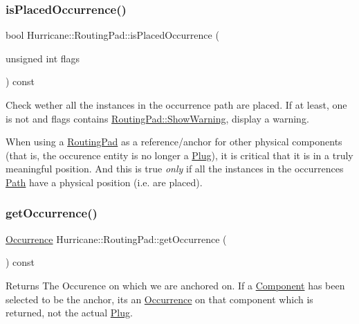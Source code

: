 \subsubsection{\texorpdfstring{is\+Placed\+Occurrence()}{isPlacedOccurrence()}}
{\footnotesize\ttfamily bool Hurricane\+::\+Routing\+Pad\+::is\+Placed\+Occurrence (\begin{DoxyParamCaption}\item[{unsigned int}]{flags }\end{DoxyParamCaption}) const}

Check wether all the instances in the occurrence path are placed. If at least, one is not and {\ttfamily flags} contains \hyperlink{classHurricane_1_1RoutingPad_a69f37f0b06b9bfd758d9be42c71e2bd4a8fd74358022a29aab828700c8f7347ba}{Routing\+Pad\+::\+Show\+Warning}, display a warning.

When using a \hyperlink{classHurricane_1_1RoutingPad}{Routing\+Pad} as a reference/anchor for other physical components (that is, the occurence entity is no longer a \hyperlink{classHurricane_1_1Plug}{Plug}), it is critical that it is in a truly meaningful position. And this is true {\itshape only} if all the instances in the occurrence\textquotesingle{}s \hyperlink{classHurricane_1_1Path}{Path} have a physical position (i.\+e. are placed). \mbox{\label{classHurricane_1_1RoutingPad_a2767550364ef01c772f3270850ec052f}} 
\subsubsection{\texorpdfstring{get\+Occurrence()}{getOccurrence()}}
{\footnotesize\ttfamily \hyperlink{classHurricane_1_1Occurrence}{Occurrence} Hurricane\+::\+Routing\+Pad\+::get\+Occurrence (\begin{DoxyParamCaption}{ }\end{DoxyParamCaption}) const\hspace{0.3cm}{\ttfamily [inline]}}

\begin{DoxyReturn}{Returns}
The Occurence on which we are anchored on. If a \hyperlink{classHurricane_1_1Component}{Component} has been selected to be the anchor, it\textquotesingle{}s an \hyperlink{classHurricane_1_1Occurrence}{Occurrence} on that component which is returned, not the actual \hyperlink{classHurricane_1_1Plug}{Plug}. 
\end{DoxyReturn}
\mbox{\label{classHurricane_1_1RoutingPad_a30190c50577ce47727dec11f5423a85b}} 
